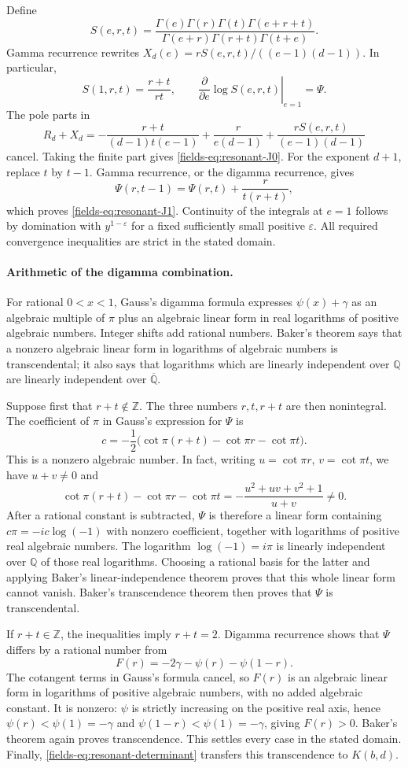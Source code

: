 \documentclass[11pt,a4paper]{article}
\theoremstyle{definition}
\theoremstyle{remark}
\numberwithin{equation}{section}
\begin{document}
Define
\[
 S(e,r,t)=\frac{\Gamma(e)\Gamma(r)\Gamma(t)\Gamma(e+r+t)}
 {\Gamma(e+r)\Gamma(r+t)\Gamma(t+e)}.
\]
Gamma recurrence rewrites $X_d(e)=rS(e,r,t)/((e-1)(d-1))$.
In particular,
\[
 S(1,r,t)=\frac{r+t}{rt},\qquad
 \left.\frac{\partial}{\partial e}\log S(e,r,t)\right|_{e=1}
 =\Psi.
\]
The pole parts in
\[
 R_d+X_d
 =-\frac{r+t}{(d-1)t(e-1)}+
   \frac{r}{e(d-1)}+
   \frac{rS(e,r,t)}{(e-1)(d-1)}
\]
cancel.  Taking the finite part gives
\eqref{fields-eq:resonant-J0}.  For the exponent $d+1$, replace $t$ by
$t-1$.  Gamma recurrence, or the digamma recurrence, gives
\[
 \Psi(r,t-1)=\Psi(r,t)+\frac{r}{t(r+t)},
\]
which proves \eqref{fields-eq:resonant-J1}.  Continuity of the integrals
at $e=1$ follows by domination with $y^{1-\varepsilon}$ for a fixed
sufficiently small positive $\varepsilon$.  All required convergence
inequalities are strict in the stated domain.

\paragraph{Arithmetic of the digamma combination.}
For rational $0<x<1$, Gauss's digamma formula \cite{fields-DLMF} expresses
$\psi(x)+\gamma$ as an algebraic multiple of $\pi$ plus an
algebraic linear form in real logarithms of positive algebraic
numbers.  Integer shifts add rational numbers.  Baker's theorem
says that a nonzero algebraic linear form in logarithms of
algebraic numbers is transcendental; it also says that logarithms
which are linearly independent over $\mathbb Q$ are linearly
independent over $\overline{\mathbb Q}$.

Suppose first that $r+t\notin\mathbb Z$.  The three numbers
$r,t,r+t$ are then nonintegral.  The coefficient of $\pi$ in
Gauss's expression for $\Psi$ is
\[
 c=-\frac12\bigl(\cot\pi(r+t)-\cot\pi r-\cot\pi t\bigr).
\]
This is a nonzero algebraic number.  In fact, writing
$u=\cot\pi r$, $v=\cot\pi t$, we have $u+v\ne0$ and
\[
 \cot\pi(r+t)-\cot\pi r-\cot\pi t
 =-\frac{u^2+uv+v^2+1}{u+v}\ne0.
\]
After a rational constant is subtracted, $\Psi$ is therefore a
linear form containing $c\pi=-ic\log(-1)$ with nonzero
coefficient, together with logarithms of positive real algebraic
numbers.  The logarithm $\log(-1)=i\pi$ is linearly independent
over $\mathbb Q$ of those real logarithms.  Choosing a rational
basis for the latter and applying Baker's linear-independence
theorem proves that this whole linear form cannot vanish.
Baker's transcendence theorem then proves that $\Psi$ is
transcendental.

If $r+t\in\mathbb Z$, the inequalities imply $r+t=2$.
Digamma recurrence shows that $\Psi$ differs by a rational number
from
\[
 F(r)=-2\gamma-\psi(r)-\psi(1-r).
\]
The cotangent terms in Gauss's formula cancel, so $F(r)$ is an
algebraic linear form in logarithms of positive algebraic
numbers, with no added algebraic constant.  It is nonzero:
$\psi$ is strictly increasing on the positive real axis, hence
$\psi(r)<\psi(1)=-\gamma$ and
$\psi(1-r)<\psi(1)=-\gamma$, giving $F(r)>0$.
Baker's theorem again proves transcendence.  This settles every
case in the stated domain.  Finally,
\eqref{fields-eq:resonant-determinant} transfers this transcendence to
$K(b,d)$.
\end{document}
